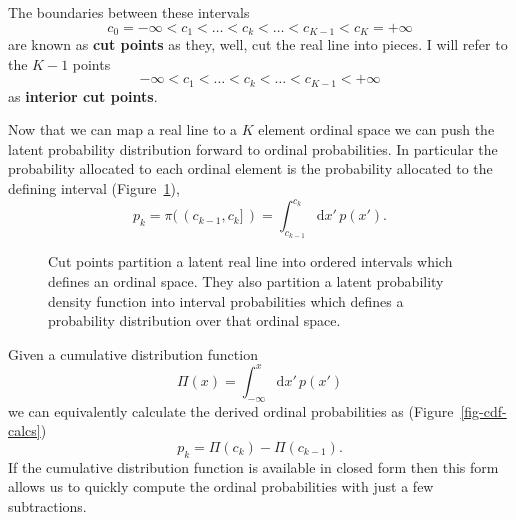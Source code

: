 \documentclass[
  letterpaper,
  DIV=11,
  numbers=noendperiod]{scrartcl}
\begin{document}
The boundaries between these intervals \[
c_{0} = -\infty
< c_{1}
< \ldots
< c_{k}
< \ldots
< c_{K - 1}
< c_{K} = +\infty
\] are known as \textbf{cut points} as they, well, cut the real line
into pieces. I will refer to the \(K - 1\) points \[
-\infty < c_{1} < \ldots < c_{k} < \ldots < c_{K - 1} < +\infty
\] as \textbf{interior cut points}.

Now that we can map a real line to a \(K\) element ordinal space we can
push the latent probability distribution forward to ordinal
probabilities. In particular the probability allocated to each ordinal
element is the probability allocated to the defining interval
(Figure~\ref{fig-interval-probs}), \[
p_{k}
= \pi( \, ( c_{k - 1}, c_{k} ] \, )
= \int_{c_{k - 1}}^{c_{k}} \mathrm{d} x' \, p(x').
\]

\begin{figure}


\caption{\label{fig-interval-probs}Cut points partition a latent real
line into ordered intervals which defines an ordinal space. They also
partition a latent probability density function into interval
probabilities which defines a probability distribution over that ordinal
space.}

\end{figure}%

Given a cumulative distribution function \[
\Pi(x) = \int_{-\infty}^{x} \mathrm{d} x' \, p(x')
\] we can equivalently calculate the derived ordinal probabilities as
(Figure~\ref{fig-cdf-calcs}) \[
p_{k} = \Pi(c_{k}) - \Pi(c_{k - 1}).
\] If the cumulative distribution function is available in closed form
then this form allows us to quickly compute the ordinal probabilities
with just a few subtractions.
\end{document}
